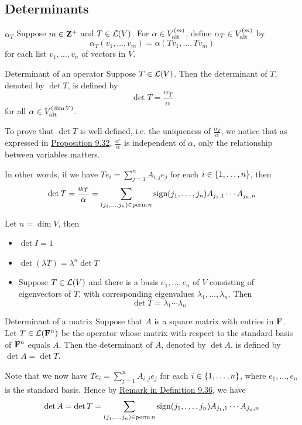 \documentclass[12pt,a4paper]{article}
\begin{document}
    \subsection{Determinants}
    \begin{defi}{$\alpha_{T}$}
        Suppose $m\in\mathbf{Z}^+$ and $T\in\mathcal{L}(V)$. For $\alpha\in V^{(m)}_{\mathrm{alt}}$, define $\alpha_{T}\in V^{(m)}_{\mathrm{alt}}$ by
        $$
        \alpha_{T}(v_1,\dots,v_m)=\alpha(Tv_1,\dots,Tv_m)
        $$
        for each list $v_1,\dots,v_n$ of vectors in $V$.
    \end{defi}
    \begin{defi}{Determinant of an operator}
        Suppose $T\in\mathcal{L}(V)$. Then the determinant of $T$, denoted by $\det T$, is defined by
        $$
        \det T=\frac{\alpha_{T}}{\alpha}
        $$
        for all $\alpha\in V^{(\dim V)}_{\mathrm{alt}}$.
    \end{defi}
    \begin{remark}\label{9.36r}
        To prove that $\det T$ is well-defined, i.e. the uniqueness of $\frac{\alpha_T}{\alpha}$, we notice that as expressed in \hyperref[9.32]{Proposition 9.32}, $\frac{\alpha'}{\alpha}$ is independent of $\alpha$, only the relationship between variables matters.

        In other words, if we have $Te_i=\sum_{j=1}^nA_{i,j}e_j$ for each $i\in\left\{1,\dots,n\right\}$, then
        $$
        \det T=\frac{\alpha_{T}}{\alpha}=\sum_{(j_{1},\dots,j_{n})\in\operatorname{perm} n}\operatorname{sign}(j_{1},\dots,j_{n})A_{j_{1},1}\cdots A_{j_{n},n}
        $$
    \end{remark}
    \begin{eg}
        Let $n=\dim V$, then
        \begin{itemize}
            \item $\det I=1$
            \item $\det(\lambda T)=\lambda^n\det T$
            \item Suppose $T\in\mathcal{L}(V)$ and there is a basis $e_1,\dots,e_n$ of $V$ consisting of eigenvectors of $T$, with corresponding eigenvalues $\lambda_1,\dots,\lambda_n$. Then 
            $$
            \det T=\lambda_1\cdots\lambda_n
            $$
        \end{itemize}
    \end{eg}
    \hfill

    \begin{defi}{Determinant of a matrix}
        Suppose that $A$ is a  square matrix with entries in $\mathbf{F}$. Let $T\in\mathcal{L}(\mathbf{F}^n)$ be the operator whose matrix with respect to the standard basis of $\mathbf{F}^n$ equals $A$. Then the determinant of $A$, denoted by $\det A$, is defined by $\det A=\det T$.
    \end{defi}
    \begin{remark}
        Note that we now have $Te_i=\sum_{j=1}^nA_{i,j}e_j$ for each $i\in\left\{1,\dots,n\right\}$, where $e_1,\dots,e_n$ is the standard basis. Hence by \hyperref[9.36r]{Remark in Definition 9.36}, we have
        $$
        \det A=\det T=\sum_{(j_{1},\dots,j_{n})\in\operatorname{perm} n}\operatorname{sign}(j_{1},\dots,j_{n})A_{j_{1},1}\cdots A_{j_{n},n}
        $$
    \end{remark}
    \hfill
\end{document}
